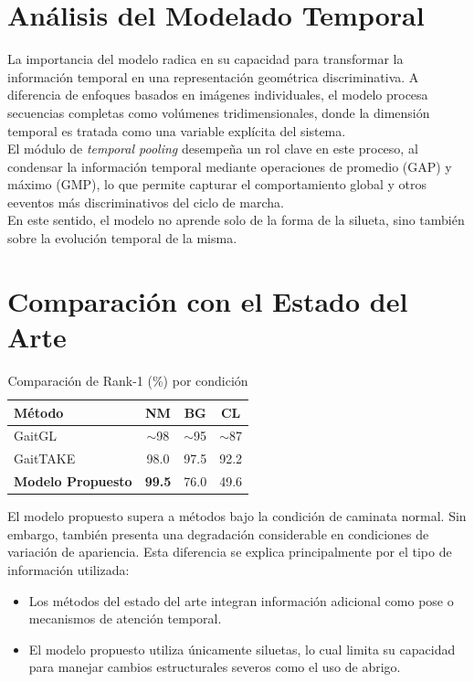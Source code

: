 \section{Análisis del Modelado Temporal}

La importancia del modelo radica en su capacidad para transformar la información temporal en una representación geométrica discriminativa. A diferencia de enfoques basados en imágenes individuales, el modelo procesa secuencias completas como volúmenes tridimensionales, donde la dimensión temporal es tratada como una variable explícita del sistema. \\
El módulo de \textit{temporal pooling} desempeña un rol clave en este proceso, al condensar la información temporal mediante operaciones de promedio (GAP) y máximo (GMP), lo que permite capturar el comportamiento global y otros eeventos más discriminativos del ciclo de marcha. \\
En este sentido, el modelo no aprende solo de la forma de la silueta, sino también sobre la evolución temporal de la misma.

\section{Comparación con el Estado del Arte}

\begin{table}[h]
\centering
\caption{Comparación de Rank-1 (\%) por condición}
\begin{tabular}{lccc}
\hline
\textbf{Método} & \textbf{NM} & \textbf{BG} & \textbf{CL} \\
\hline
GaitGL \cite{Lin2022GaitGL} & $\sim$98 & $\sim$95 & $\sim$87 \\
GaitTAKE \cite{Hsu2022GaitTAKE} & 98.0 & 97.5 & 92.2 \\
\hline
\textbf{Modelo Propuesto} & \textbf{99.5} & 76.0 & 49.6 \\
\hline
\end{tabular}
\end{table}

El modelo propuesto supera a métodos bajo la condición de caminata normal. Sin embargo, también presenta una degradación considerable en condiciones de variación de apariencia. Esta diferencia se explica principalmente por el tipo de información utilizada:

\begin{itemize}
    \item Los métodos del estado del arte integran información adicional como pose o mecanismos de atención temporal.
    
    \item El modelo propuesto utiliza únicamente siluetas, lo cual limita su capacidad para manejar cambios estructurales severos como el uso de abrigo.
\end{itemize}

